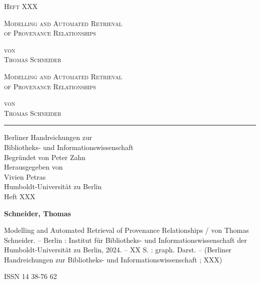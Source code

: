 \begin{titlepage}
\vspace{2cm}

{\LARGE \scshape Heft XXX \par} %

\vspace{2,5cm}

{\Large \scshape \foreignlanguage{english}{Modelling and Automated Retrieval} \\ \foreignlanguage{english}{of Provenance Relationships} \par}

\vspace{2cm}

{\LARGE \scshape von \\ Thomas Schneider}

\end{titlepage}

\clearpage{\thispagestyle{empty}\cleardoublepage}
\clearpage{\thispagestyle{empty}\cleardoublepage}
\centering
\phantom{x}
\vspace{5cm}

{\Large \scshape \foreignlanguage{english}{Modelling and Automated Retrieval} \\ \foreignlanguage{english}{of Provenance Relationships} \par}

\vspace{4cm}

{\Large \scshape von \\ Thomas Schneider \par}

\vspace{3cm}
\hrule
\vspace{1cm}
\raggedleft
{\Large Berliner Handreichungen zur \\
Bibliotheks- und Informationswissenschaft \\
\vspace{1cm}
Begründet von Peter Zahn \\
Herausgegeben von \\
Vivien Petras \\
Humboldt-Universität zu Berlin \\
\vspace{.5cm}
Heft XXX} %

\newpage
\thispagestyle{empty}
\justifying
\phantom{x}
\vspace{.5cm}

{ \large \textbf{Schneider, Thomas} \par

\foreignlanguage{english}{Modelling and Automated Retrieval of Provenance Relationships}
/ von Thomas Schneider. -- Berlin : Institut für Bibliotheks- und Informationswissenschaft
der Humboldt-Universität zu Berlin, 2024. -- XX S. : graph. Darst. -- (Berliner Handreichungen zur Bibliotheks- und Informationswissenschaft
; XXX) \par %

 ISSN 14 38-76 62 \par} %


